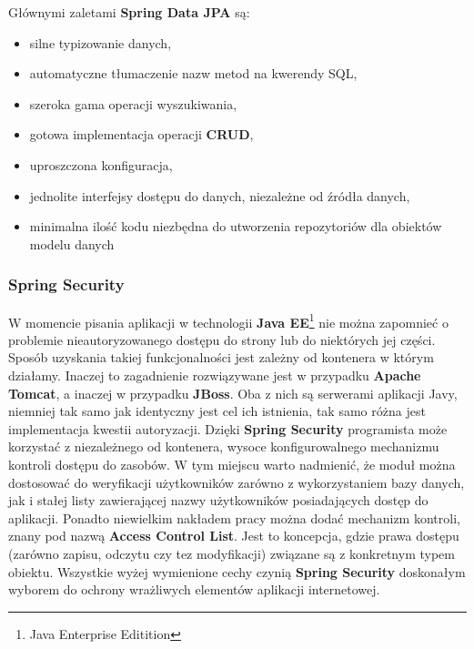 		Głównymi zaletami \textbf{Spring Data JPA} są:
		\begin{itemize}
			\item silne typizowanie danych,
			\item automatyczne tłumaczenie nazw metod na kwerendy SQL,
			\item szeroka gama operacji wyszukiwania,
			\item gotowa implementacja operacji \textbf{CRUD},
			\item uproszczona konfiguracja,
			\item jednolite interfejsy dostępu do danych, niezależne od źródła danych,
			\item minimalna ilość kodu niezbędna do utworzenia repozytoriów dla obiektów modelu danych
		\end{itemize}
		
		\subsubsection{Spring Security}	
		W momencie pisania aplikacji w technologii \textbf{Java EE}\footnote{Java Enterprise Editition} nie można zapomnieć o problemie nieautoryzowanego dostępu do strony lub do niektórych jej części. Sposób uzyskania takiej funkcjonalności jest zależny od kontenera w którym działamy. Inaczej to zagadnienie rozwiązywane jest w przypadku \textbf{Apache Tomcat}, a inaczej w przypadku \textbf{JBoss}. Oba z nich są serwerami aplikacji Javy, niemniej tak samo jak identyczny jest cel ich istnienia, tak samo różna jest implementacja kwestii autoryzacji. Dzięki \textbf{Spring Security} programista może korzystać z niezależnego od kontenera, wysoce konfigurowalnego mechanizmu kontroli dostępu do zasobów. W tym miejscu warto nadmienić, że moduł można dostosować do weryfikacji użytkowników zarówno z wykorzystaniem bazy danych, jak i stałej listy zawierającej nazwy użytkowników posiadających dostęp do aplikacji. Ponadto niewielkim nakładem pracy można dodać mechanizm kontroli, znany pod nazwą \textbf{Access Control List}. Jest to koncepcja, gdzie prawa dostępu (zarówno zapisu, odczytu czy tez modyfikacji) związane są z konkretnym typem obiektu. Wszystkie wyżej wymienione cechy czynią \textbf{Spring Security} doskonałym wyborem do ochrony wrażliwych elementów aplikacji internetowej. 
		
		\clearpage
